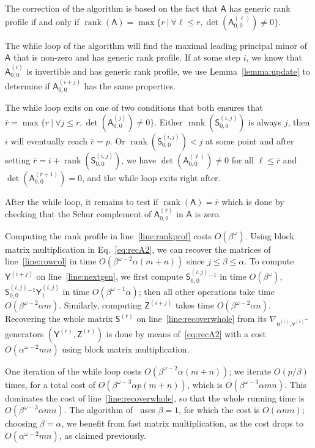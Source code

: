 \documentclass{sig-alternate}
\newcommand{\vu}{\ensuremath{\mathsf{u}}}
\newcommand{\vv}{\ensuremath{\mathsf{v}}}
\newcommand{\mA}{\ensuremath{\mathsf{A}}}
\newcommand{\mS}{\ensuremath{\mathsf{S}}}
\newcommand{\mY}{\ensuremath{\mathsf{Y}}}
\newcommand{\mZ}{\ensuremath{\mathsf{Z}}}
\newcommand{\rank}{\ensuremath{\operatorname{rank}}}
\begin{document}
\smallskip{}
The correction of the algorithm is based on the fact that $\mA$ has
generic rank profile if and only if
$\rank(\mA) = \max\{ r \ |\  \forall \ell \leq r, \det(\mA^{(\ell)}_{0,0}) \neq
0 \}$.

The while loop of the algorithm will find the maximal leading
principal minor of $\mA$ that is non-zero and has generic rank
profile. If at some step $i$, we know that $\mA^{(i)}_{0,0}$ is
invertible and has generic rank profile, we use
Lemma~\ref{lemma:update} to determine if $\mA^{(i+j)}_{0,0}$ has the
same properties.

The while loop exits on one of two conditions that both ensures that
$\bar{r} = \max\{ r \ |\ \forall j \leq r, \det(\mA^{(j)}_{0,0}) \neq
0 \}$.
Either $\rank(\mS^{(i,j)}_{0,0})$ is always $j$, then $i$ will
eventually reach $\bar{r}=p$. Or $\rank(\mS^{(i,j)}_{0,0})<j$ at some
point and after setting $\bar{r}=i+\rank( \mS^{(i,j)}_{0,0})$, we
have $\det(\mA^{(\ell)}_{0,0}) \neq 0$ for all $\ell \leq \bar{r}$
and $\det(\mA^{(\bar{r}+1)}_{0,0}) = 0$, and the while loop exits
right after.

After the while loop, it remains to test if $\rank(\mA) = \bar{r}$
which is done by checking that the Schur complement of
$\mA^{(\bar{r})}_{0,0}$ in $\mA$ is zero.

\smallskip{} Computing the rank profile
in line~\ref{line:rankprof} costs $O(\beta^\omega)$.  Using block
matrix multiplication in Eq.~\eqref{eq:recA2}, we can recover the
matrices of line~\ref{line:rowcol} in time
$O(\beta^{\omega-2} \alpha (m+n))$ since $j \le \beta \le \alpha$.  To
compute $\mY^{(i+j)}$ on line~\ref{line:nextgen}, we first compute
$\mS^{(i,j)}_{0,0}{}^{-1}$ in time $O(\beta^{\omega})$,
$\mS^{(i,j)}_{0,0}{}^{-1} \mY^{(i,j)}_1$ in time
$O(\beta^{\omega-1} \alpha)$; then all other operations take time
$O(\beta^{\omega-2} \alpha m)$.  Similarly, computing $\mZ^{(i+j)}$
takes time $O(\beta^{\omega-2} \alpha n)$.  Recovering the whole
matrix $\mS^{(\bar{r})}$ on line~\ref{line:recoverwhole} from its
$\nabla_{\vu^{(\bar{r})},\vv^{(\bar{r})}}$-generators
$(\mY^{(\bar{r})},\mZ^{(\bar{r})})$ is done by means
of~\eqref{eq:recA2} with a cost $O(\alpha^{\omega-2} mn)$ using block
matrix multiplication.

One iteration of the while loop costs
$O(\beta^{\omega-2} \alpha (m+n))$; we iterate $O(p/\beta)$ times, for
a total cost of $O(\beta^{\omega-3} \alpha p(m+n))$, which is
$O(\beta^{\omega-3} \alpha mn)$. This dominates the cost of
line~\ref{line:recoverwhole}, so that the whole running time is
$O(\beta^{\omega-3} \alpha mn)$. The algorithm of~\cite{Mouilleron08}
uses $\beta=1$, for which the cost is $O(\alpha mn)$; choosing
$\beta=\alpha$, we benefit from fast matrix multiplication, as the
cost drops to $O(\alpha^{\omega-2} mn)$, as claimed previously.
\end{document}
